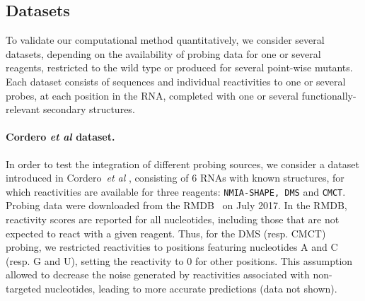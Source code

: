 \documentclass[a4,center,fleqn]{NAR}
\newcommand{\SH }{{\tt SHAPE}\xspace}
\newcommand{\etal}{~\emph{et al} }
\begin{document}



\subsection{Datasets} 
\label{sec:datasets}
To validate our computational method quantitatively, we consider several datasets, depending on the availability of probing data for one or several reagents, restricted to the wild type or produced for several point-wise mutants. Each dataset consists of sequences and individual reactivities to one or several probes, at each position in the RNA, completed with one or several functionally-relevant secondary structures.


\paragraph{Cordero \emph{et al} dataset.} 
In order to test the integration of different probing sources, we consider a dataset introduced in Cordero\etal\cite{Cordero2012}, consisting of $6$ RNAs with known structures, for which reactivities are available for three reagents: {\tt NMIA-\SH, DMS} and {\tt CMCT}. 
Probing data were downloaded from the RMDB~\citep{Cordero2012a} on July 2017. In the RMDB, reactivity scores are reported for all nucleotides, including those that are not expected to react with a given reagent. Thus, for the DMS (resp. CMCT) probing, we restricted reactivities to positions featuring nucleotides {\sf A} and {\sf C} (resp. {\sf G} and {\sf U}), setting the reactivity to 0 for other positions. This assumption allowed to decrease the noise generated by reactivities associated with non-targeted nucleotides, leading to more accurate predictions (data not shown). 
\end{document}
